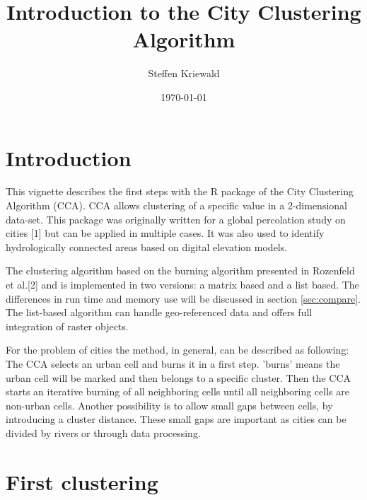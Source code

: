 \documentclass[10pt,a4paper]{article}
\begin{document}


\title{Introduction to the City Clustering Algorithm}
\author{Steffen Kriewald}
\date{\today}
\maketitle
\tableofcontents

\section{Introduction}

This vignette describes the first steps with the R package of the City Clustering Algorithm (CCA). CCA allows clustering of a specific value in a 2-dimensional data-set. This package was originally written for a global percolation study on cities [1] but can be applied in multiple cases. It was also used to identify hydrologically connected areas based on digital elevation models.

The clustering algorithm based on the burning algorithm presented in Rozenfeld et al.[2] and is implemented in two versions: a matrix based and a list based. The differences in run time and memory use will be discussed in section \ref{sec:compare}. The list-based algorithm can handle geo-referenced data and offers full integration of raster objects.

For the problem of cities the method, in general, can be described as following: The CCA selects an urban cell and burns it in a first step. 'burns' means the urban cell will be marked and then belongs to a specific cluster. Then the CCA starts an iterative burning of all neighboring cells until all neighboring cells are non-urban cells. Another possibility is to allow small gaps between cells, by introducing a cluster distance. These small gaps are important as cities can be divided by rivers or through data processing.

\section{First clustering}
\label{sec:first}
\end{document}
